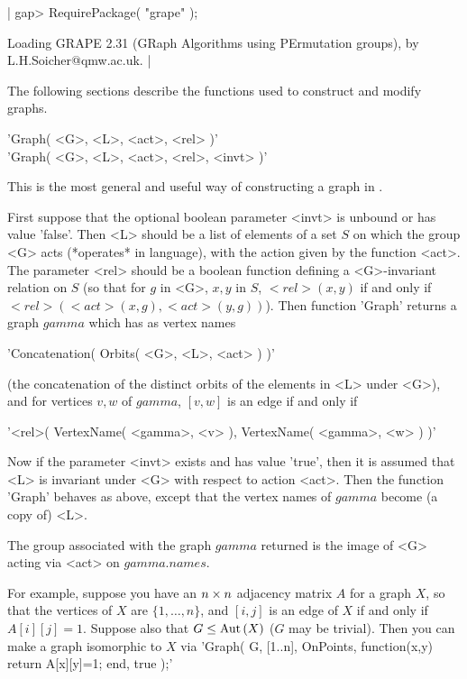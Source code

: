 |    gap> RequirePackage( "grape" );

    Loading  GRAPE 2.31  (GRaph Algorithms using PErmutation groups),
    by L.H.Soicher@qmw.ac.uk.
    |


The  following sections describe  the functions  used to construct and
modify graphs.


'Graph( <G>, <L>, <act>, <rel> )'\\
'Graph( <G>, <L>, <act>, <rel>, <invt> )'

This  is the most  general  and  useful  way  of constructing a graph  in
{\GRAPE}.

First  suppose that the optional  boolean parameter <invt> is  unbound or
has value 'false'.  Then <L> should be a list of elements of a set $S$ on
which the group <G> acts (*operates* in {\GAP} language), with the action
given by  the function <act>.   The parameter <rel>   should be a boolean
function defining a <G>-invariant  relation on $S$ (so  that for  $g$  in
<G>,     $x,y$      in    $S$,     $<rel>(x,y)$   if     and    only   if
$<rel>(<act>(x,g),<act>(y,g))$).  Then  function 'Graph'  returns a graph
$gamma$ which has as vertex names
\begin{center}
    'Concatenation( Orbits( <G>, <L>, <act> ) )'
\end{center}
(the concatenation of the  distinct orbits  of the elements  in <L> under
<G>), and for vertices $v,w$  of $gamma$, $[v,w]$  is an edge if and only
if
\begin{center}
    '<rel>( VertexName( <gamma>, <v> ), VertexName( <gamma>, <w> ) )'
\end{center}

Now if the  parameter <invt> exists  and  has value 'true',  then  it  is
assumed  that <L> is invariant  under <G> with respect  to  action <act>.
Then the function 'Graph' behaves as above,  except that the vertex names
of $gamma$ become (a copy of) <L>.

The group associated with the graph $gamma$ returned is  the image of <G>
acting via <act> on $gamma.names$.

For example, suppose you have an $n\times n$ adjacency matrix $A$ for a graph
$X$, so that the vertices of $X$ are $\{1,\ldots,n\}$, and  $[i,j]$ is an
edge of $X$  if and only  if $A[i][j]=1$.  Suppose  also that  $G\le {\rm Aut}\,
(X)$ ($G$ may be trivial).  Then you can make a {\GRAPE} graph isomorphic
to $X$  via 'Graph( G,  [1..n], OnPoints, function(x,y) return A[x][y]=1;
end, true );'

